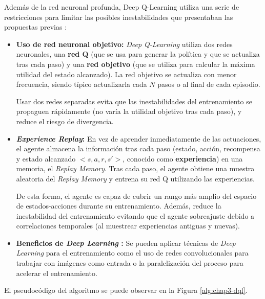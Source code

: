 Además de la red neuronal profunda, Deep Q-Learning utiliza una serie de restricciones para limitar las posibles inestabilidades que presentaban las propuestas previas \cite{DBLP:journals/corr/abs-1811-12560}:
\begin{itemize}
	\item \textbf{Uso de red neuronal objetivo:} \textit{Deep Q-Learning} utiliza dos redes neuronales, una \textbf{red Q} (que se usa para generar la política y que se actualiza tras cada paso) y una \textbf{red objetivo} (que se utiliza para calcular la máxima utilidad del estado alcanzado). La red objetivo se actualiza con menor frecuencia, siendo típico actualizarla cada $N$ pasos o al final de cada episodio.
	
	Usar dos redes separadas evita que las inestabilidades del entrenamiento se propaguen rápidamente (no varía la utilidad objetivo tras cada paso), y reduce el riesgo de divergencia.
	\item \textbf{\textit{Experience Replay}:} En vez de aprender inmediatamente de las actuaciones, el agente almacena la información tras cada paso (estado, acción, recompensa y estado alcanzado $<s, a, r, s'>$, conocido como \textbf{experiencia}) en una memoria, el \textit{Replay Memory}. Tras cada paso, el agente obtiene una muestra aleatoria del \textit{Replay Memory} y entrena su red Q utilizando las experiencias.
	
	De esta forma, el agente es capaz de cubrir un rango más amplio del espacio de estados-acciones durante su entrenamiento. Además, reduce la inestabilidad del entrenamiento evitando que el agente sobreajuste debido a correlaciones temporales (al muestrear experiencias antiguas y nuevas).
	\item \textbf{Beneficios de \textit{Deep Learning} \cite{Mnih2015HumanlevelCT}:} Se pueden aplicar técnicas de \textit{Deep Learning} para el entrenamiento como el uso de redes convolucionales para trabajar con imágenes como entrada o la paralelización del proceso para acelerar el entrenamiento.
\end{itemize}

El pseudocódigo del algoritmo se puede observar en la Figura \ref{alg:chap3-dql}.

